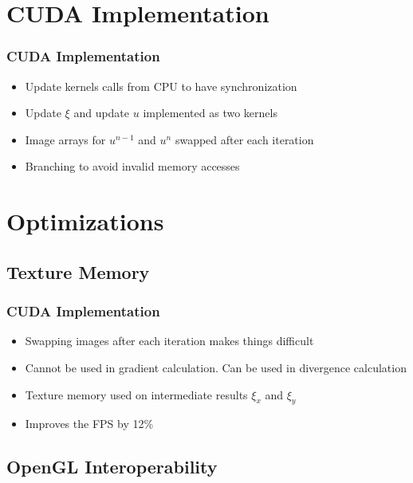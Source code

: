 \documentclass{beamer}
\begin{document}
\section{CUDA Implementation}

\begin{frame}
  \frametitle{CUDA Implementation}
  \begin{itemize}
  \item Update kernels calls from CPU to have synchronization

  \item Update $ \xi $ and update $ u $ implemented as two kernels

  \item Image arrays for $ u^{n-1} $ and $ u^n $ swapped after each iteration

  \item Branching to avoid invalid memory accesses
  
  \end{itemize}

\end{frame}

\section{Optimizations}


\subsection{Texture Memory}

\begin{frame}
  \frametitle{CUDA Implementation}
  \begin{itemize}
  \item Swapping images after each iteration makes things difficult

  \item Cannot be used in gradient calculation. Can be used in divergence calculation

  \item Texture memory used on intermediate results $ \xi_x $ and $ \xi_y $
  
  \item Improves the FPS by 12\%
  
  \end{itemize}

\end{frame}

\subsection{OpenGL Interoperability}
\end{document}

